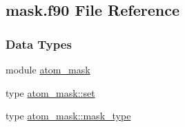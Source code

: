 \hypertarget{mask_8f90}{\subsection{mask.\-f90 File Reference}
\label{mask_8f90}
}
\subsubsection*{Data Types}
\begin{DoxyCompactItemize}
\item 
module \hyperlink{classatom__mask}{atom\-\_\-mask}
\item 
type \hyperlink{structatom__mask_1_1set}{atom\-\_\-mask\-::set}
\item 
type \hyperlink{structatom__mask_1_1mask__type}{atom\-\_\-mask\-::mask\-\_\-type}
\end{DoxyCompactItemize}
